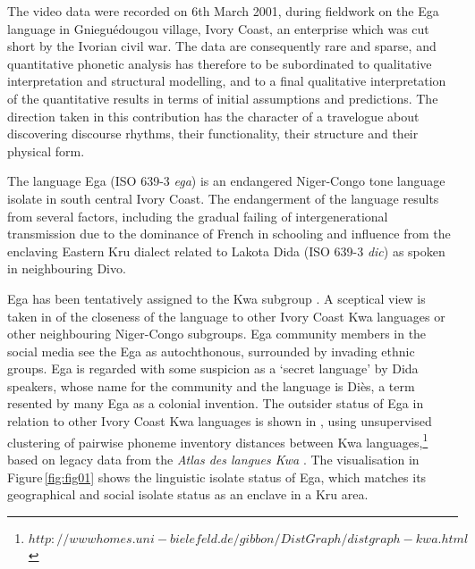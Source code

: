 \documentclass[output=paper,colorlinks,citecolor=brown
]{langscibook}
\begin{document}
The video data were recorded on 6th March 2001, during fieldwork on the Ega language in Gnieguédougou village, Ivory Coast, an enterprise which was cut short by the Ivorian civil war. The data are consequently rare and sparse, and quantitative phonetic analysis has therefore to be subordinated to qualitative interpretation and structural modelling, and to a final qualitative interpretation of the quantitative results in terms of initial assumptions and predictions. The direction taken in this contribution has the character of a travelogue about discovering discourse rhythms, their functionality, their structure and their physical form.

The language Ega (ISO 639-3 \textit{ega}) is an endangered Niger-Congo tone language isolate in south central Ivory Coast. The endangerment of the language results from several factors, including the gradual failing of intergenerational transmission due to the dominance of French in schooling and influence from the enclaving Eastern Kru dialect related to Lakota Dida (ISO 639-3 \textit{dic}) as spoken in neighbouring Divo.

Ega has been tentatively assigned to the Kwa subgroup \cite{bolerichard1983, connellahouagibbon2002, salffner2004}. A sceptical view is taken in \cite{blench2015, blench2017} of the closeness of the language to other Ivory Coast Kwa languages or other neighbouring Niger-Congo subgroups. Ega community members in the social media see the Ega as autochthonous, surrounded by invading ethnic groups. Ega is regarded with some suspicion as a `secret language' by Dida speakers, whose name for the community and the language is Diès, a term resented by many Ega as a colonial invention. The outsider status of Ega in relation to other Ivory Coast Kwa languages is shown in \cite{gibbonweb2014}, using unsupervised clustering of pairwise phoneme inventory distances between Kwa languages,\footnote{$http://wwwhomes.uni-bielefeld.de/gibbon/DistGraph/distgraph-kwa.html$} based on legacy data from the \textit{Atlas des langues Kwa} \cite{herault1983}. The visualisation in Figure\,\ref{fig:fig01} shows the linguistic isolate status of Ega, which matches its geographical and social isolate status as an enclave in a Kru area.
\end{document}
